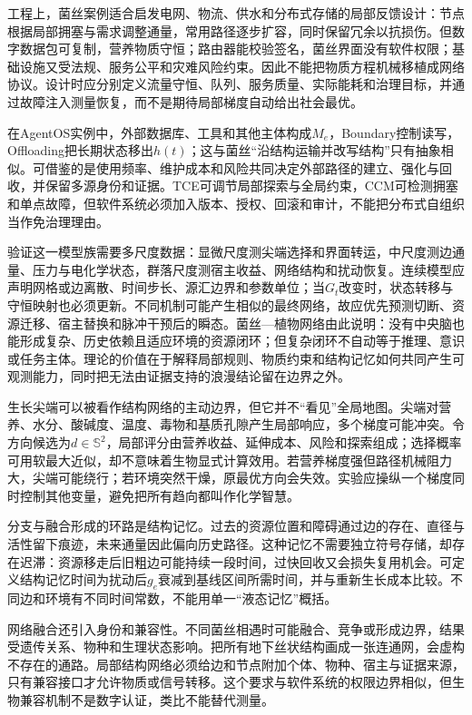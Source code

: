 工程上，菌丝案例适合启发电网、物流、供水和分布式存储的局部反馈设计：节点根据局部拥塞与需求调整通量，常用路径逐步扩容，同时保留冗余以抗损伤。但数字数据包可复制，营养物质守恒；路由器能校验签名，菌丝界面没有软件权限；基础设施又受法规、服务公平和灾难风险约束。因此不能把物质方程机械移植成网络协议。设计时应分别定义流量守恒、队列、服务质量、实际能耗和治理目标，并通过故障注入测量恢复，而不是期待局部梯度自动给出社会最优。

在AgentOS实例中，外部数据库、工具和其他主体构成$M_e$，Boundary控制读写，Offloading把长期状态移出$h(t)$；这与菌丝“沿结构运输并改写结构”只有抽象相似。可借鉴的是使用频率、维护成本和风险共同决定外部路径的建立、强化与回收，并保留多源身份和证据。TCE可调节局部探索与全局约束，CCM可检测拥塞和单点故障，但软件系统必须加入版本、授权、回滚和审计，不能把分布式自组织当作免治理理由。

验证这一模型族需要多尺度数据：显微尺度测尖端选择和界面转运，中尺度测边通量、压力与电化学状态，群落尺度测宿主收益、网络结构和扰动恢复。连续模型应声明网格或边离散、时间步长、源汇边界和参数单位；当$G_t$改变时，状态转移与守恒映射也必须更新。不同机制可能产生相似的最终网络，故应优先预测切断、资源迁移、宿主替换和脉冲干预后的瞬态。菌丝—植物网络由此说明：没有中央脑也能形成复杂、历史依赖且适应环境的资源闭环；但复杂闭环不自动等于推理、意识或任务主体。理论的价值在于解释局部规则、物质约束和结构记忆如何共同产生可观测能力，同时把无法由证据支持的浪漫结论留在边界之外。

生长尖端可以被看作结构网络的主动边界，但它并不“看见”全局地图。尖端对营养、水分、酸碱度、温度、毒物和基质孔隙产生局部响应，多个梯度可能冲突。令方向候选为$d\in\mathbb S^2$，局部评分由营养收益、延伸成本、风险和探索组成；选择概率可用软最大近似，却不意味着生物显式计算效用。若营养梯度强但路径机械阻力大，尖端可能绕行；若环境突然干燥，原最优方向会失效。实验应操纵一个梯度同时控制其他变量，避免把所有趋向都叫作化学智慧。

分支与融合形成的环路是结构记忆。过去的资源位置和障碍通过边的存在、直径与活性留下痕迹，未来通量因此偏向历史路径。这种记忆不需要独立符号存储，却存在迟滞：资源移走后旧粗边可能持续一段时间，过快回收又会损失复用机会。可定义结构记忆时间为扰动后$g_e$衰减到基线区间所需时间，并与重新生长成本比较。不同边和环境有不同时间常数，不能用单一“液态记忆”概括。

网络融合还引入身份和兼容性。不同菌丝相遇时可能融合、竞争或形成边界，结果受遗传关系、物种和生理状态影响。把所有地下丝状结构画成一张连通网，会虚构不存在的通路。局部结构网络必须给边和节点附加个体、物种、宿主与证据来源，只有兼容接口才允许物质或信号转移。这个要求与软件系统的权限边界相似，但生物兼容机制不是数字认证，类比不能替代测量。

